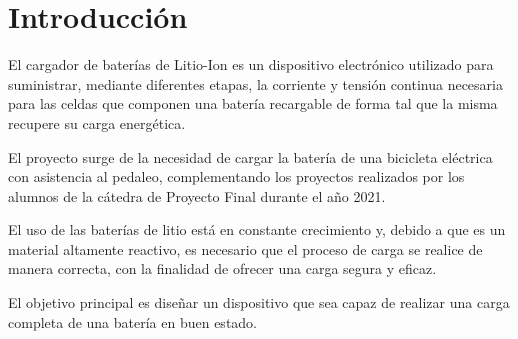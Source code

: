 \section{Introducción}






El cargador de baterías de Litio-Ion es un dispositivo electrónico utilizado para suministrar, mediante diferentes etapas, la corriente y tensión continua necesaria para las celdas que componen una batería recargable de forma tal que la misma recupere su carga energética.

El proyecto surge de la necesidad de cargar la batería de una bicicleta eléctrica con asistencia al pedaleo,
complementando los proyectos realizados por los alumnos de la cátedra de Proyecto Final durante el año 2021.

El uso de las baterías de litio está en constante crecimiento y,
debido a que es un material altamente reactivo,
es necesario que el proceso de carga se realice de manera correcta,
con la finalidad de ofrecer una carga segura y eficaz.

El objetivo principal es diseñar un dispositivo que sea capaz de realizar una carga completa de una batería en buen estado.